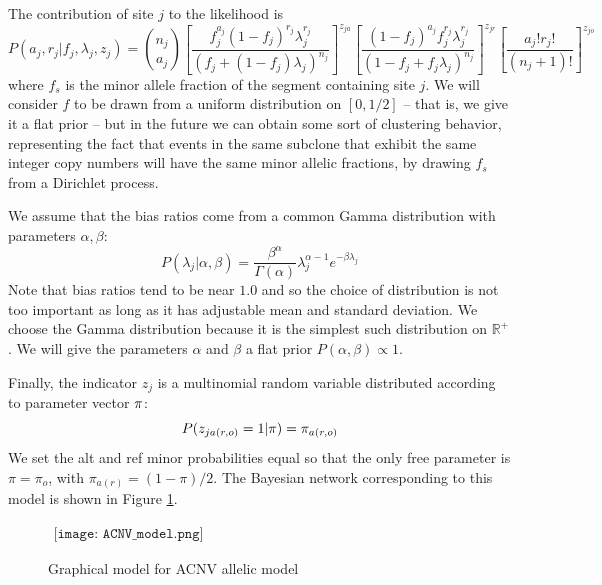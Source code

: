 \documentclass[nofootinbib,amssymb,amsmath]{revtex4}
\begin{document}
The contribution of site $j$ to the likelihood is
%
\begin{equation}
P(a_j, r_j | f_j, \lambda_j, z_j) =  \binom{n_j}{a_j}  
\left[ \frac{f_j^{a_j} (1 - f_j)^{r_j} \lambda_j^{r_j}}{ \left( f_j + (1-f_j) \lambda_j \right)^{n_j}} \right]^{z_{ja}}   
\left[ \frac{(1-f_j)^{a_j} f_j^{r_j} \lambda_j^{r_j}}{ \left( 1 - f_j + f_j \lambda_j \right)^{n_j}} \right]^{z_{jr}}   
\left[ \frac{a_j! r_j!}{(n_j + 1)!} \right]^{z_{jo}}
\label{likelihood}
\end{equation}
%
where $f_s$ is the minor allele fraction of the segment containing site $j$.  We will consider $f$ to be drawn from a uniform distribution on $[0, 1/2]$ -- that is, we give it a flat prior -- but in the future we can obtain some sort of clustering behavior, representing the fact that events in the same subclone that exhibit the same integer copy numbers will have the same minor allelic fractions, by drawing $f_s$ from a Dirichlet process.

We assume that the bias ratios come from a common Gamma distribution with parameters $\alpha, \beta$:
%
\begin{equation}
P(\lambda_j | \alpha, \beta) = \frac{\beta^\alpha}{\Gamma(\alpha)} \lambda_j^{\alpha-1} e^{-\beta \lambda_j}
\end{equation}
%
Note that bias ratios tend to be near $1.0$ and so the choice of distribution is not too important as long as it has adjustable mean and standard deviation.  We choose the Gamma distribution because it is the simplest such distribution on $\mathbb{R}^+$.  We will give the parameters $\alpha$ and $\beta$ a flat prior $P(\alpha, \beta) \propto 1$.

Finally, the indicator $z_j$ is a multinomial random variable distributed according to parameter vector ${\bf \pi}$:
%
\begin{equation}
P(z_{ja(r,o)} = 1 | {\bf \pi}) = \pi_{a(r,o)}
\end{equation}
We set the alt and ref minor probabilities equal so that the only free parameter is $\pi = \pi_o$, with $\pi_{a(r)} = (1 - \pi)/2$.
%
The Bayesian network corresponding to this model is shown in Figure \ref{graphical_model}.
\begin{figure}
$
\begin{array}{c}
\texttt{[image: ACNV\_model.png]} 
\end{array}
$
\label{graphical_model}
\caption{Graphical model for ACNV allelic model} 
\end{figure}
\end{document}
